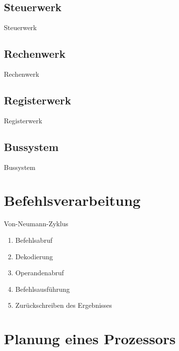\documentclass{beamer}
\begin{document}
\subsection{Steuerwerk}
\begin{frame}{Steuerwerk}

\end{frame}



\subsection{Rechenwerk}
\begin{frame}{Rechenwerk}

\end{frame}


\subsection{Registerwerk}
\begin{frame}{Registerwerk}
\end{frame}

\subsection{Bussystem}
\begin{frame}{Bussystem}

\end{frame}

\section{Befehlsverarbeitung}
\begin{frame}{Von-Neumann-Zyklus}
\begin{enumerate}\pause
\item{Befehlsabruf}\pause
\item{Dekodierung}\pause
\item{Operandenabruf}\pause
\item{Befehlsausf\"uhrung}\pause
\item{Zur\"uckschreiben des Ergebnisses}
\end{enumerate}
\end{frame}

\section{Planung eines Prozessors}
\end{document}
